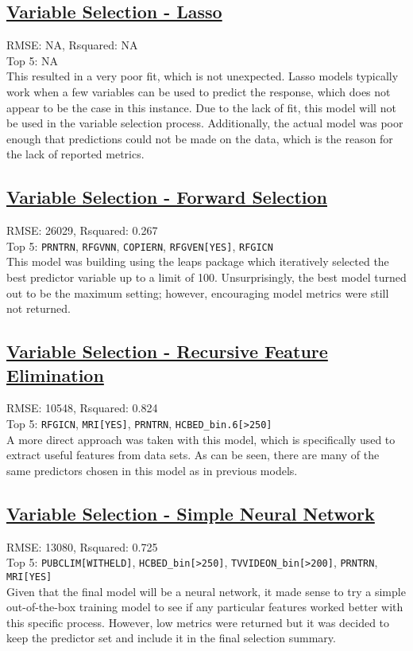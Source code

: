\subsection{\hyperref[appendix:electricity:l]{Variable Selection - Lasso}}
RMSE: NA, Rsquared: NA\\
 Top 5: NA
\\[0.1in]
\indent This resulted in a very poor fit, which is not unexpected.  Lasso models typically work when a few variables can be used to predict the response, which does not appear to be the case in this instance.  Due to the lack of fit, this model will not be used in the variable selection process.  Additionally, the actual model was poor enough that predictions could not be made on the data, which is the reason for the lack of reported metrics.

\subsection{\hyperref[appendix:electricity:lp]{Variable Selection - Forward Selection}}
RMSE: 26029, Rsquared: 0.267\\
Top 5: \lstinline{PRNTRN}, \lstinline{RFGVNN}, \lstinline{COPIERN}, \lstinline{RFGVEN[YES]}, \lstinline{RFGICN}
\\[0.1in]
\indent This model was building using the leaps package which iteratively selected the best predictor variable up to a limit of 100.  Unsurprisingly, the best model turned out to be the maximum setting; however, encouraging model metrics were still not returned.

\subsection{\hyperref[appendix:electricity:rfe]{Variable Selection - Recursive Feature Elimination}}
RMSE: 10548, Rsquared: 0.824\\
Top 5: \lstinline{RFGICN}, \lstinline{MRI[YES]}, \lstinline{PRNTRN}, \lstinline{HCBED_bin.6[>250]}
\\[0.1in]
\indent A more direct approach was taken with this model, which is specifically used to extract useful features from data sets.  As can be seen, there are many of the same predictors chosen in this model as in previous models.

\subsection{\hyperref[appendix:electricity:snn]{Variable Selection - Simple Neural Network}}
RMSE: 13080, Rsquared: 0.725\\
Top 5: \lstinline{PUBCLIM[WITHELD]}, \lstinline{HCBED_bin[>250]}, \lstinline{TVVIDEON_bin[>200]}, \lstinline{PRNTRN}, \lstinline{MRI[YES]}
\\[0.1in]
\indent Given that the final model will be a neural network, it made sense to try a simple out-of-the-box training model to see if any particular features worked better with this specific process.  However, low metrics were returned but it was decided to keep the predictor set and include it in the final selection summary.

